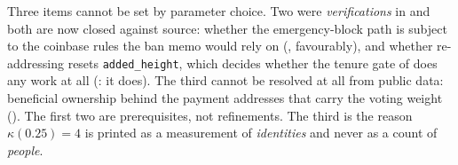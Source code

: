 Three items cannot be set by parameter choice. Two were \emph{verifications} in \fluxd{} and both
are now closed against source: whether the emergency-block path is subject to the coinbase rules the
ban memo would rely on (, favourably), and whether re-addressing resets
\texttt{added\_height}, which decides whether the tenure gate of  does any
work at all (: it does). The third cannot be resolved at all from public
data:
beneficial ownership behind the payment addresses that carry the voting weight
(). The first two are prerequisites, not refinements. The third is the reason
$\kappa(0.25) = 4$ is printed as a measurement of \emph{identities} and never as a count of
\emph{people}.

\FloatBarrier
